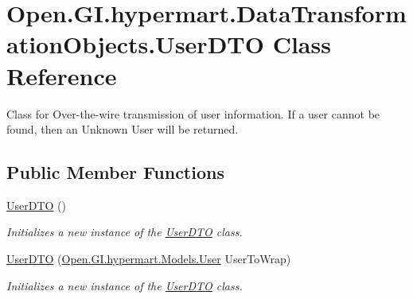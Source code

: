 \hypertarget{class_open_1_1_g_i_1_1hypermart_1_1_data_transformation_objects_1_1_user_d_t_o}{}\section{Open.\+G\+I.\+hypermart.\+Data\+Transformation\+Objects.\+User\+D\+T\+O Class Reference}
\label{class_open_1_1_g_i_1_1hypermart_1_1_data_transformation_objects_1_1_user_d_t_o}


Class for Over-\/the-\/wire transmission of user information. If a user cannot be found, then an Unknown User will be returned.  


\subsection*{Public Member Functions}
\begin{DoxyCompactItemize}
\item 
\hyperlink{class_open_1_1_g_i_1_1hypermart_1_1_data_transformation_objects_1_1_user_d_t_o_ab715e6cac8b432f39c5fe6f22e3db645}{User\+D\+T\+O} ()
\begin{DoxyCompactList}\small\item\em Initializes a new instance of the \hyperlink{class_open_1_1_g_i_1_1hypermart_1_1_data_transformation_objects_1_1_user_d_t_o}{User\+D\+T\+O} class. \end{DoxyCompactList}\item 
\hyperlink{class_open_1_1_g_i_1_1hypermart_1_1_data_transformation_objects_1_1_user_d_t_o_a21ce2f8eaac0781bcc484f8eeca38404}{User\+D\+T\+O} (\hyperlink{class_open_1_1_g_i_1_1hypermart_1_1_models_1_1_user}{Open.\+G\+I.\+hypermart.\+Models.\+User} User\+To\+Wrap)
\begin{DoxyCompactList}\small\item\em Initializes a new instance of the \hyperlink{class_open_1_1_g_i_1_1hypermart_1_1_data_transformation_objects_1_1_user_d_t_o}{User\+D\+T\+O} class. \end{DoxyCompactList}\end{DoxyCompactItemize}
